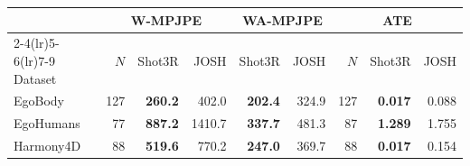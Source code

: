 \begin{tabular}{lrrrrrrrr}
  \toprule
  & \multicolumn{3}{c}{W-MPJPE} & \multicolumn{2}{c}{WA-MPJPE} & \multicolumn{3}{c}{ATE} \\
  \cmidrule(lr){2-4}\cmidrule(lr){5-6}\cmidrule(lr){7-9}
  Dataset & $N$ & Shot3R & JOSH & Shot3R & JOSH & $N$ & Shot3R & JOSH \\
  \midrule
  EgoBody   & 127 & \textbf{260.2} & 402.0 & \textbf{202.4} & 324.9 & 127 & \textbf{0.017} & 0.088 \\
  EgoHumans & 77  & \textbf{887.2} & 1410.7 & \textbf{337.7} & 481.3 & 87 & \textbf{1.289} & 1.755 \\
  Harmony4D & 88  & \textbf{519.6} & 770.2 & \textbf{247.0} & 369.7 & 88 & \textbf{0.017} & 0.154 \\
  \bottomrule
\end{tabular}
